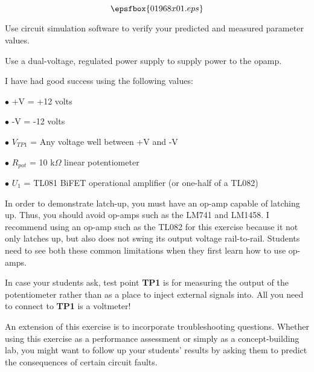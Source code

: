 

$$\epsfbox{01968x01.eps}$$

\vfil \eject






Use circuit simulation software to verify your predicted and measured parameter values.







Use a dual-voltage, regulated power supply to supply power to the opamp.

I have had good success using the following values:

\medskip
\item{$\bullet$} +V = +12 volts
\item{$\bullet$} -V = -12 volts
\item{$\bullet$} $V_{TP1}$ = Any voltage well between +V and -V
\item{$\bullet$} $R_{pot}$ = 10 k$\Omega$ linear potentiometer
\item{$\bullet$} $U_1$ = TL081 BiFET operational amplifier (or one-half of a TL082)
\medskip

In order to demonstrate latch-up, you must have an op-amp capable of latching up.  Thus, you should avoid op-amps such as the LM741 and LM1458.  I recommend using an op-amp such as the TL082 for this exercise because it not only latches up, but also does not swing its output voltage rail-to-rail.  Students need to see both these common limitations when they first learn how to use op-amps.

In case your students ask, test point {\bf TP1} is for measuring the output of the potentiometer rather than as a place to inject external signals into.  All you need to connect to {\bf TP1} is a voltmeter!

An extension of this exercise is to incorporate troubleshooting questions.  Whether using this exercise as a performance assessment or simply as a concept-building lab, you might want to follow up your students' results by asking them to predict the consequences of certain circuit faults.




